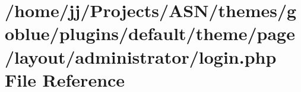 \hypertarget{themes_2goblue_2plugins_2default_2theme_2page_2layout_2administrator_2login_8php}{}\section{/home/jj/\+Projects/\+A\+S\+N/themes/goblue/plugins/default/theme/page/layout/administrator/login.php File Reference}
\label{themes_2goblue_2plugins_2default_2theme_2page_2layout_2administrator_2login_8php}
